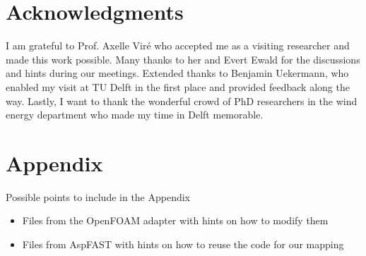 \documentclass{layout/tudelft-aiaa}
\begin{document}













\section*{Acknowledgments}

I am grateful to Prof. Axelle Viré who accepted me as a visiting researcher and made this work possible. Many thanks to her and Evert Ewald for the discussions and hints during our meetings. Extended thanks to Benjamin Uekermann, who enabled my visit at TU Delft in the first place and provided feedback along the way. Lastly, I want to thank the wonderful crowd of PhD researchers in the wind energy department who made my time in Delft memorable.


\printbibliography


\section*{Appendix}

Possible points to include in the Appendix
\begin{itemize}
	\item Files from the OpenFOAM adapter with hints on how to modify them
	\item Files from AspFAST with hints on how to reuse the code for our mapping
\end{itemize}
\end{document}
